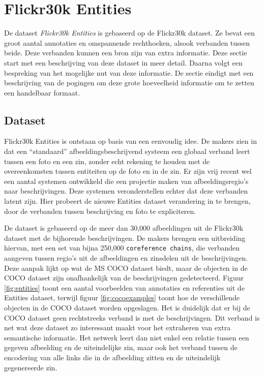 \section{Flickr30k Entities}
De dataset \emph{Flickr30k Entities}\cite{Plummer2015} is gebaseerd op de Flickr30k dataset. Ze bevat een groot aantal annotaties en omspannende rechthoeken, alsook verbanden tussen beide. Deze verbanden kunnen een bron zijn van extra informatie. Deze sectie start met een beschrijving van deze dataset in meer detail. Daarna volgt een bespreking van het mogelijke nut van deze informatie. De sectie eindigt met een beschrijving van de pogingen om deze grote hoeveelheid informatie om te zetten een handelbaar formaat. 

\subsection{Dataset}
\label{sub:Dataset}
Flickr30k Entities is ontstaan op basis van een eenvoudig idee. De makers zien in dat een ``standaard'' afbeeldingsbeschrijvend systeem een globaal verband leert tussen een foto en een zin, zonder echt rekening te houden met de overeenkomsten tussen entiteiten op de foto en in de zin. Er zijn vrij recent wel een aantal systemen ontwikkeld die een projectie maken van afbeeldingsregio's naar beschrijvingen. Deze systemen veronderstellen echter dat deze verbanden latent zijn. Hier probeert de nieuwe Entities dataset verandering in te brengen, door de verbanden tussen beschrijving en foto te expliciteren.

De dataset is gebaseerd op de meer dan 30,000 afbeeldingen uit de Flickr30k dataset\cite{Young2014} met de bijhorende beschrijvingen. De makers brengen een uitbreiding hiervan, met een set van bijna 250,000 \texttt{coreference chains}, die verbanden aangeven tussen regio's uit de afbeeldingen en zinsdelen uit de beschrijvingen. Deze aanpak lijkt op wat de MS COCO\cite{Lin2014} dataset biedt, maar de objecten in de COCO dataset zijn onafhankelijk van de beschrijvingen gedetecteerd. Figuur \ref{fig:entities} toont een aantal voorbeelden van annotaties en referenties uit de Entities dataset, terwijl figuur \ref{fig:cocoexamples} toont hoe de verschillende objecten in de COCO dataset worden opgeslagen. Het is duidelijk dat er bij de COCO dataset geen rechtstreeks verband is met de beschrijvingen. Dit verband is net wat deze dataset zo interessant maakt voor het extraheren van extra semantische informatie. Het netwerk leert dan niet enkel een relatie tussen een gegeven afbeelding en de uiteindelijke zin, maar ook het verband tussen de encodering van alle links die in de afbeelding zitten en de uiteindelijk gegenereerde zin.

